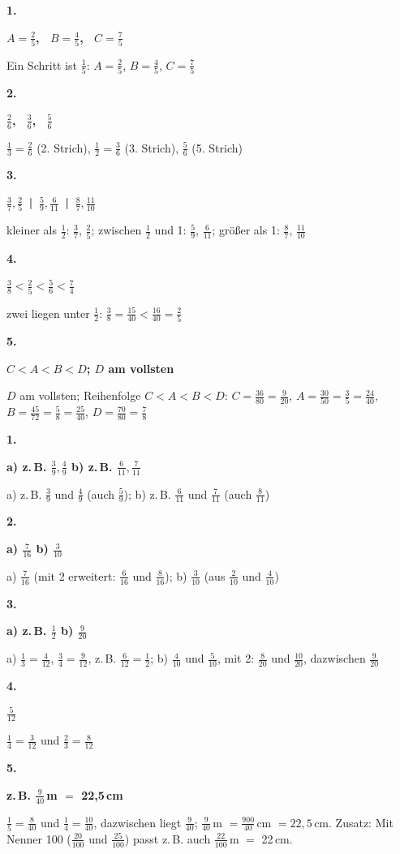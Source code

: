 \documentclass[11pt]{article}
\newcommand{\lsg}[3]{\par\noindent\begin{minipage}[t]{9mm}\textbf{#1}\end{minipage}%
  \begin{minipage}[t]{52mm}\raggedright\bfseries\boldmath #2\end{minipage}\hspace{3mm}%
  \begin{minipage}[t]{\dimexpr\linewidth-64mm\relax}\raggedright\small #3\end{minipage}\par\vspace{4pt}}
\begin{document}
\lsg{1.}{$A = \frac{2}{5}$, \ $B = \frac{4}{5}$, \ $C = \frac{7}{5}$}{Ein Schritt ist $\frac{1}{5}$: $A = \frac{2}{5}$, $B = \frac{4}{5}$, $C = \frac{7}{5}$}
\lsg{2.}{$\frac{2}{6}$, \ $\frac{3}{6}$, \ $\frac{5}{6}$}{$\frac{1}{3} = \frac{2}{6}$ (2. Strich), $\frac{1}{2} = \frac{3}{6}$ (3. Strich), $\frac{5}{6}$ (5. Strich)}
\lsg{3.}{$\frac{3}{7}, \frac{2}{5}$ \,|\, $\frac{5}{9}, \frac{6}{11}$ \,|\, $\frac{8}{7}, \frac{11}{10}$}{kleiner als $\frac{1}{2}$: $\frac{3}{7}$, $\frac{2}{5}$; zwischen $\frac{1}{2}$ und 1: $\frac{5}{9}$, $\frac{6}{11}$; größer als 1: $\frac{8}{7}$, $\frac{11}{10}$}
\lsg{4.}{$\frac{3}{8} < \frac{2}{5} < \frac{5}{6} < \frac{7}{4}$}{zwei liegen unter $\frac{1}{2}$: $\frac{3}{8} = \frac{15}{40} < \frac{16}{40} = \frac{2}{5}$}
\lsg{5.}{$C < A < B < D$; $D$ am vollsten}{$D$ am vollsten; Reihenfolge $C < A < B < D$: $C = \frac{36}{80} = \frac{9}{20}$, $A = \frac{30}{50} = \frac{3}{5} = \frac{24}{40}$, $B = \frac{45}{72} = \frac{5}{8} = \frac{25}{40}$, $D = \frac{70}{80} = \frac{7}{8}$}
\par\Needspace{25mm}\vspace{6pt}\noindent\colorbox{black!12}{}\hspace{2mm}{\bfseries Einen Bruch dazwischen finden}\par\vspace{4pt}
\lsg{1.}{a) z.\,B. $\frac{3}{9}, \frac{4}{9}$ \quad b) z.\,B. $\frac{6}{11}, \frac{7}{11}$}{a) z.\,B. $\frac{3}{9}$ und $\frac{4}{9}$ (auch $\frac{5}{9}$); b) z.\,B. $\frac{6}{11}$ und $\frac{7}{11}$ (auch $\frac{8}{11}$)}
\lsg{2.}{a) $\frac{7}{16}$ \quad b) $\frac{3}{10}$}{a) $\frac{7}{16}$ (mit 2 erweitert: $\frac{6}{16}$ und $\frac{8}{16}$); b) $\frac{3}{10}$ (aus $\frac{2}{10}$ und $\frac{4}{10}$)}
\lsg{3.}{a) z.\,B. $\frac{1}{2}$ \quad b) $\frac{9}{20}$}{a) $\frac{1}{3} = \frac{4}{12}$, $\frac{3}{4} = \frac{9}{12}$, z.\,B. $\frac{6}{12} = \frac{1}{2}$; b) $\frac{4}{10}$ und $\frac{5}{10}$, mit 2: $\frac{8}{20}$ und $\frac{10}{20}$, dazwischen $\frac{9}{20}$}
\lsg{4.}{$\frac{5}{12}$}{$\frac{1}{4} = \frac{3}{12}$ und $\frac{2}{3} = \frac{8}{12}$}
\lsg{5.}{z.\,B. $\frac{9}{40}$\,m $=$ 22{,}5\,cm}{$\frac{1}{5} = \frac{8}{40}$ und $\frac{1}{4} = \frac{10}{40}$, dazwischen liegt $\frac{9}{40}$; $\frac{9}{40}$\,m $= \frac{900}{40}$\,cm $= 22{,}5$\,cm. Zusatz: Mit Nenner 100 ($\frac{20}{100}$ und $\frac{25}{100}$) passt z.\,B. auch $\frac{22}{100}$\,m $=$ 22\,cm.}
\par\Needspace{25mm}\vspace{6pt}\noindent\colorbox{black!12}{}\hspace{2mm}{\bfseries Probetest}\par\vspace{4pt}
\end{document}
